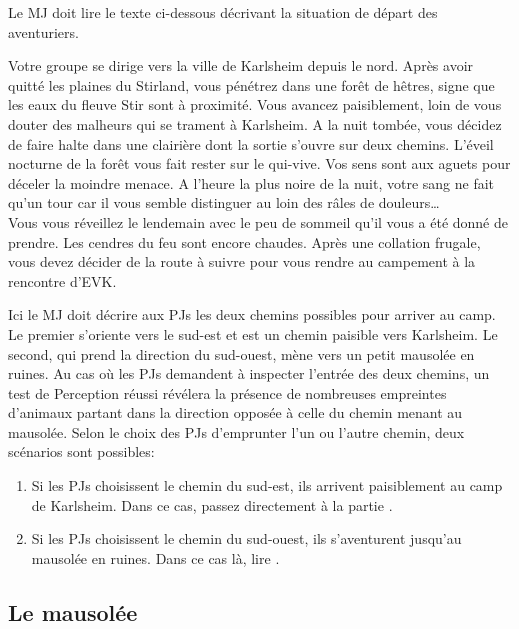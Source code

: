 \documentclass[french,oneside]{wfrp}
\begin{document}
\newpage

Le MJ doit lire le texte ci-dessous décrivant la situation de départ
des aventuriers.

\begin{mjbox}
  Votre groupe se dirige vers la ville de Karlsheim depuis le
  nord. Après avoir quitté les plaines du Stirland, vous pénétrez dans
  une forêt de hêtres, signe que les eaux du fleuve Stir sont à
  proximité. Vous avancez paisiblement, loin de vous douter des
  malheurs qui se trament à Karlsheim. A la nuit tombée, vous décidez
  de faire halte dans une clairière dont la sortie s’ouvre sur deux
  chemins. L’éveil nocturne de la forêt vous fait rester sur le
  qui-vive. Vos sens sont aux aguets pour déceler la moindre menace. A
  l’heure la plus noire de la nuit, votre sang ne fait qu’un tour car
  il vous semble distinguer au loin des râles de
  douleurs\dots \\

  Vous vous réveillez le lendemain avec le peu de sommeil qu’il vous
  a été donné de prendre. Les cendres du feu sont encore
  chaudes. Après une collation frugale, vous devez décider de la
  route à suivre pour vous rendre au campement à la rencontre d’EVK.
\end{mjbox}

Ici le MJ doit décrire aux PJs les deux chemins possibles pour arriver
au camp. Le premier s’oriente vers le sud-est et est un chemin
paisible vers Karlsheim. Le second, qui prend la direction du
sud-ouest, mène vers un petit mausolée en ruines. Au cas où les PJs
demandent à inspecter l’entrée des deux chemins, un test de Perception
réussi révélera la présence de nombreuses empreintes d’animaux partant
dans la direction opposée à celle du chemin menant au mausolée. Selon
le choix des PJs d’emprunter l’un ou l’autre chemin, deux scénarios
sont possibles:

\begin{enumerate}
\item Si les PJs choisissent le chemin du sud-est, ils arrivent
  paisiblement au camp de Karlsheim. Dans ce cas, passez directement
  à la partie .
\item Si les PJs choisissent le chemin du sud-ouest, ils s’aventurent
  jusqu’au mausolée en ruines. Dans ce cas là, lire
  .
\end{enumerate}

\subsection{Le mausolée}
\label{sec:mausolee}
\end{document}
